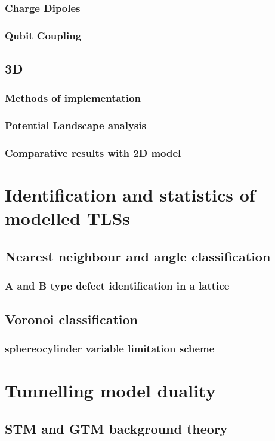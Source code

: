     \subsection{Charge Dipoles}
    \subsection{Qubit Coupling}
    \section{3D}
    \subsection{Methods of implementation}
    \subsection{Potential Landscape analysis}
    \subsection{Comparative results with 2D model}
    \chapter{Identification and statistics of modelled TLSs}
    \section{Nearest neighbour and angle classification}
    \subsection{A and B type defect identification in a lattice}
    \section{Voronoi classification}
    \subsection{sphereocylinder variable limitation scheme}
    \chapter{Tunnelling model duality}
    \section{STM and GTM background theory}
